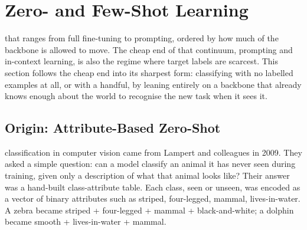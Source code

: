 \vspace{2.5em}



\newpage
\section{Zero- and Few-Shot Learning}


 that ranges from full fine-tuning to prompting, ordered by how much of the backbone is allowed to move. The cheap end of that continuum, prompting and in-context learning, is also the regime where target labels are scarcest. This section follows the cheap end into its sharpest form: classifying with no labelled examples at all, or with a handful, by leaning entirely on a backbone that already knows enough about the world to recognise the new task when it sees it.

\subsection{Origin: Attribute-Based Zero-Shot}


 classification in computer vision came from Lampert and colleagues in 2009\cite{Lampert2009}. They asked a simple question: can a model classify an animal it has never seen during training, given only a description of what that animal looks like? Their answer was a hand-built class-attribute table. Each class, seen or unseen, was encoded as a vector of binary attributes such as striped, four-legged, mammal, lives-in-water. A zebra became striped + four-legged + mammal + black-and-white; a dolphin became smooth + lives-in-water + mammal.

